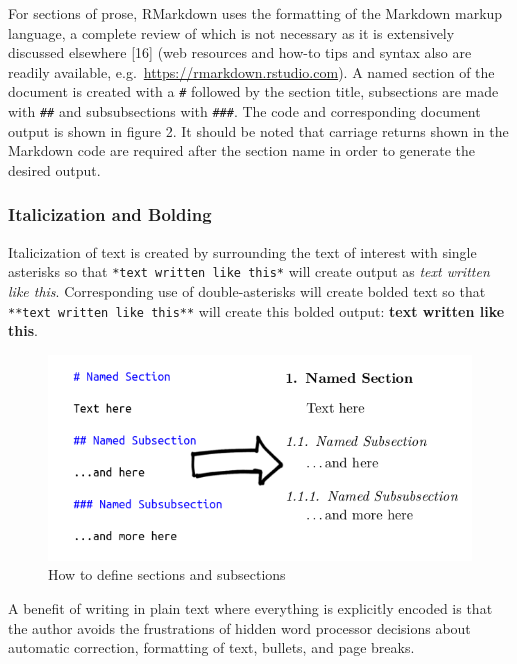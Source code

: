 \documentclass[]{elsarticle} %
\begin{document}
For sections of prose, RMarkdown uses the formatting of the Markdown
markup language, a complete review of which is not necessary as it is
extensively discussed elsewhere {[}16{]} (web resources and how-to tips
and syntax also are readily available,
e.g.~\url{https://rmarkdown.rstudio.com}). A named section of the
document is created with a \texttt{\#} followed by the section title,
subsections are made with \texttt{\#\#} and subsubsections with
\texttt{\#\#\#}. The code and corresponding document output is shown in
figure 2. It should be noted that carriage returns shown in the Markdown
code are required after the section name in order to generate the
desired output.

\hypertarget{italicization-and-bolding}{%
\subsubsection{Italicization and
Bolding}\label{italicization-and-bolding}}

Italicization of text is created by surrounding the text of interest
with single asterisks so that \texttt{*text\ written\ like\ this*} will
create output as \emph{text written like this}. Corresponding use of
double-asterisks will create bolded text so that
\texttt{**text\ written\ like\ this**} will create this bolded output:
\textbf{text written like this}.

\begin{figure}[H]

{\centering \includegraphics[width=0.75\linewidth,]{Figure2} 

}

\caption{How to define sections and subsections}\label{fig:fig2}
\end{figure}

A benefit of writing in plain text where everything is explicitly
encoded is that the author avoids the frustrations of hidden word
processor decisions about automatic correction, formatting of text,
bullets, and page breaks.
\end{document}
